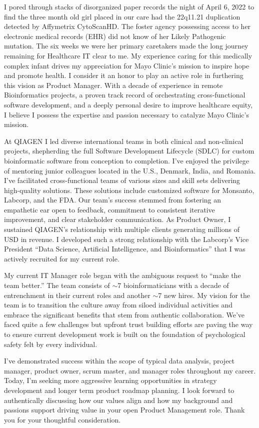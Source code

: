 \documentclass[10pt,letterpaper]{article}
\begin{document}
\begin{flushleft}
	I pored through stacks of disorganized paper records the night of April 6, 2022 to find the three month old girl placed in our care had the 22q11.21 duplication detected by Affymetrix CytoScanHD. The foster agency possessing access to her electronic medical records (EHR) did not know of her Likely Pathogenic mutation. The six weeks we were her primary caretakers made the long journey remaining for Healthcare IT clear to me. My experience caring for this medically complex infant drives my appreciation for Mayo Clinic's mission to inspire hope and promote health. I consider it an honor to play an active role in furthering this vision as Product Manager. With a decade of experience in remote Bioinformatics projects, a proven track record of orchestrating cross-functional software development, and a deeply personal desire to improve healthcare equity, I believe I possess the expertise and passion necessary to catalyze Mayo Clinic's mission.
	
	At QIAGEN I led diverse international teams in both clinical and non-clinical projects, shepherding the full Software Development Lifecycle (SDLC) for custom bioinformatic software from conception to completion. I\rq{}ve enjoyed the privilege of mentoring junior colleagues located in the U.S., Denmark, India, and Romania. I\rq{}ve facilitated cross-functional teams of various sizes and skill sets delivering high-quality solutions. These solutions include customized software for Monsanto, Labcorp, and the FDA. Our team\rq{}s success stemmed from fostering an empathetic ear open to feedback, commitment to consistent iterative improvement, and clear stakeholder communication. As Product Owner, I sustained QIAGEN's relationship with multiple clients generating millions of USD in revenue. I developed such a strong relationship with the Labcorp\rq{}s Vice President  “Data Science, Artificial Intelligence, and Bioinformatics” that I was actively recruited for my current role. 
	 
	My current IT Manager role began with the ambiguous request to “make the team better.” The team consists of \(\sim \)7 bioinformaticians with a decade of entrenchment in their current roles and another \(\sim \)7 new hires. My vision for the team is to transition the culture away from siloed individual activities and embrace the significant benefits that stem from authentic collaboration. We\rq{}ve faced quite a few challenges but upfront trust building efforts are paving the way to ensure current development work is built on the foundation of psychological safety felt by every individual.  
	
	I\rq{}ve demonstrated success within the scope of typical data analysis, project manager, product owner,  scrum master, and manager roles throughout my career. Today, I\rq{}m seeking more aggressive learning opportunities in strategy development and longer term product roadmap planning. I look forward to authentically discussing how our values align and how my background and passions support driving value in your open Product Management role. Thank you for your thoughtful consideration.
	

\end{flushleft}
\end{document}
